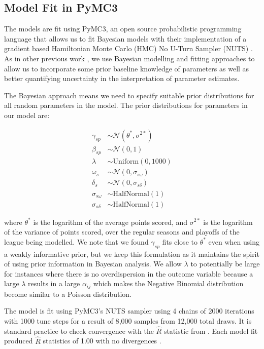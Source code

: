 \subsection*{Model Fit in PyMC3}

The models are fit using PyMC3, an open source probabilistic programming language that allows us to fit Bayesian models with their implementation of a gradient based Hamiltonian Monte Carlo (HMC) No U-Turn Sampler (NUTS) \cite{pymc3}. As in other previous work \cite{Baio2010} \cite{Benz2020}, we use Bayesian modelling and fitting approaches to allow us to incorporate some prior baseline knowledge of parameters as well as better quantifying uncertainty in the interpretation of parameter estimates.

The Bayesian approach means we need to specify suitable prior distributions for all random parameters in the model. The prior distributions for parameters in our model are:

\begin{equation}
\begin{split}
\gamma_{sp} &\sim \mathcal{N}(\theta^*, \sigma^{2*}) \\
\beta_{sp} &\sim \mathcal{N}(0, 1) \\
\lambda &\sim \text{Uniform}(0, 1000) \\
\omega_s &\sim \mathcal{N}(0, \sigma_{s\omega}) \\
\delta_s &\sim \mathcal{N}(0, \sigma_{s\delta}) \\
\sigma_{s\omega} &\sim \text{HalfNormal}(1) \\
\sigma_{s\delta} &\sim \text{HalfNormal}(1)
\end{split}
\end{equation}

where \(\theta^*\) is the logarithm of the average points scored, and \(\sigma^{2*}\) is the logarithm of the variance of points scored, over the regular seasons and playoffs of the league being modelled. We note that we found \(\gamma_{sp}\) fits close to \(\theta^*\) even when using a weakly informative prior, but we keep this formulation as it maintains the spirit of using prior information in Bayesian analysis. We allow \(\lambda\) to potentially be large for instances where there is no overdispersion in the outcome variable because a large \(\lambda\) results in a large \(\alpha_{ij}\) which makes the Negative Binomial distribution become similar to a Poisson distribution.

The model is fit using PyMC3's NUTS sampler using 4 chains of 2000 iterations with 1000 tune steps for a result of 8,000 samples from 12,000 total draws. It is standard practice to check convergence with the \(\hat{R}\) statistic from \cite{Gelman1992} \cite{Brooks1997}.  Each model fit produced \(\hat{R}\) statistics of 1.00 with no divergences \cite{Betancourt2017}.

